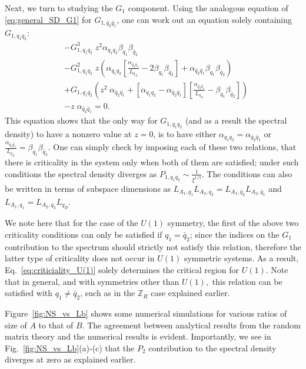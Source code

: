 \documentclass[aps,pra,reprint,superscriptaddress,twocolumn,notitlepage]{revtex4-1}
\numberwithin{equation}{section}
\begin{document}
Next, we turn to studying the $G_1$ component. Using the analogous equation of \eqref{eq:general_SD_G1} for $G_{1,\bar{q}_2\bar{q}_1}$, one can work out an equation solely containing $G_{1,q_1q_2}$:
\begin{equation}\label{eq:general_SD_G1_single_component}
\begin{aligned}
    & - G_{1,q_1q_2}^3 \; z^2 \alpha_{q_1 q_2}  \beta_{q_1}\beta_{\bar{q}_2}  \\
    & - G_{1,q_1q_2}^2 \; z \left( \alpha_{q_1q_2} \left[ \frac{\alpha_{\bar{q}_2\bar{q}_1}}{L_{q_A}}  - 2 \beta_{q_1} \beta_{\bar{q}_2} \right] + \alpha_{\bar{q}_2\bar{q}_1}   \beta_{q_1} \beta_{\bar{q}_2} \right) \\
    & + G_{1,q_1q_2} \left( z^2 \;  \alpha_{\bar{q}_2\bar{q}_1}  + \left[ \alpha_{q_1q_2}  - \alpha_{\bar{q}_2\bar{q}_1} \right] \left[  \frac{\alpha_{\bar{q}_2\bar{q}_1}}{L_{q_A}}  - \beta_{q_1} \beta_{\bar{q}_2} \right] \right) \\
    &- z \; \alpha_{\bar{q}_2\bar{q}_1}  = 0.
\end{aligned}    
\end{equation}
This equation shows that the only way for $G_{1,q_1q_2}$ (and as a result the spectral density) to have a nonzero value at $z=0$, is to have either 
$\alpha_{q_1q_2}  = \alpha_{\bar{q}_2\bar{q}_1}$ or
$\frac{\alpha_{\bar{q}_2\bar{q}_1}}{L_{q_A}}  = \beta_{q_1} \beta_{\bar{q}_2}$. 
One can simply check by imposing each of these two relations, that there is criticality in the system only when both of them are satisfied; under such conditions the spectral density diverges as $P_{1,q_1q_2} \sim \frac{1}{\xi^{1/3}}$. The conditions can also be written in terms of subspace dimensions as $L_{A_1,q_1} L_{A_2,q_2} = L_{A_1,\bar{q}_2} L_{A_2,\bar{q}_1}$ and $L_{A_1,q_1} = L_{A_2,q_2} L_{q_B}$. 

We note here that for the case of the $U(1)$ symmetry, the first of the above two criticality conditions can only be satisfied if $q_1 = \bar{q}_2$; since the indices on the $G_1$ contribution to the spectrum should strictly not satisfy this relation, therefore the latter type of criticality does not occur in $U(1)$ symmetric systems. As a result,  Eq.~\eqref{eq:criticiality_U(1)} solely determines the critical region for $U(1)$.
Note that in general, and with symmetries other than $U(1),$ this relation can be satisfied with $q_1 \neq \bar{q}_2$, such as in the $\mathbb{Z}_R$ case explained earlier.

Figure~\ref{fig:NS_vs_Lb} shows some numerical simulations for various ratios of size of $A$ to that of $B$. The agreement between analytical results from the random matrix theory and the numerical results is evident. Importantly, we see in Fig.~\ref{fig:NS_vs_Lb}(a)-(c) that the $P_2$ contribution to the spectral density diverges at zero as explained earlier.
\end{document}
